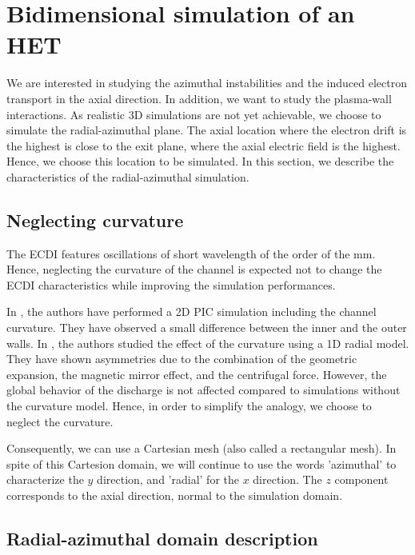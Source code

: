 
\section{Bidimensional simulation of an \acs{HET}}
\label{sec-bidimentionnal_simulation}

We are interested in studying the azimuthal instabilities and the induced electron transport in the axial direction.
In addition, we want to study the plasma-wall interactions.
As realistic \ac{3D} simulations are not yet achievable, we choose to simulate the radial-azimuthal plane.
The axial location where the electron drift is the highest is close to the exit plane, where the axial electric field is the highest.
Hence, we choose this location to be simulated.
In this section, we describe the characteristics of the radial-azimuthal simulation.


\subsection{Neglecting curvature}
The \ac{ECDI} features oscillations of short wavelength of the order of the mm.
Hence, neglecting the curvature of the channel is expected not to change the \ac{ECDI} characteristics while improving the simulation performances.

In  \citet{heron2013},  the authors have performed a \ac{2D} \ac{PIC} simulation including the channel curvature.
They have observed a small difference between the inner and the outer walls.
In  \citet{dominguez-vazquez2018}, the authors studied the effect of the curvature using a \ac{1D} radial model.
They have shown asymmetries due to the combination of the geometric expansion, the magnetic mirror effect, and the centrifugal force.
However, the global behavior of the discharge is not affected compared to simulations without the curvature model.
Hence, in order to simplify the analogy, we choose to neglect the curvature.

Consequently, we can use a Cartesian mesh (also called a rectangular mesh).
In spite of this Cartesion domain, we will continue to use the words 'azimuthal' to characterize the $y$ direction, and 'radial' for the $x$ direction.
The $z$ component corresponds to the axial direction, normal to the simulation domain.

\subsection{Radial-azimuthal domain description}

